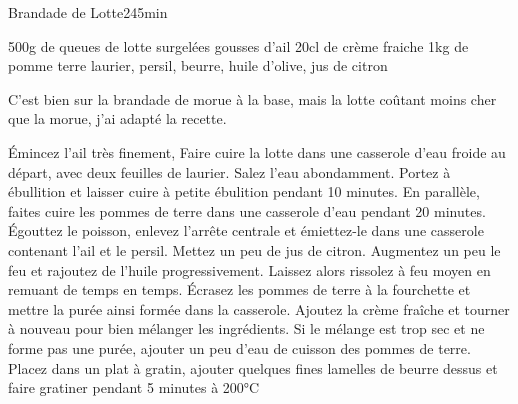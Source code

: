 \begin{recette}{Brandade de Lotte}{2}{45min}{}
\begin{ingredients}
\ingredient 500g de queues de lotte surgelées
 gousses d'ail
\ingredient 20cl de crème fraiche
\ingredient 1kg de pomme terre
\ingredient laurier, persil, beurre, huile d'olive, jus de citron
\end{ingredients}

\begin{remarque}
C'est bien sur la brandade de morue à la base, mais la lotte coûtant moins cher que la morue, j'ai adapté la recette.
\end{remarque}


\begin{preparation}
\etape Émincez l'ail très finement, 
\etape Faire cuire la lotte dans une casserole d'eau froide au départ, avec deux feuilles de laurier. Salez l'eau abondamment. Portez à ébullition et laisser cuire à petite ébulition pendant 10 minutes.
\etape En parallèle, faites cuire les pommes de terre dans une casserole d'eau pendant 20 minutes.
\etape Égouttez le poisson, enlevez l'arrête centrale et émiettez-le dans une casserole contenant l'ail et le persil. Mettez un peu de jus de citron. Augmentez un peu le feu et rajoutez de l'huile progressivement. Laissez alors rissolez à feu moyen en remuant de temps en temps.
\etape Écrasez les pommes de terre à la fourchette et mettre la purée ainsi formée dans la casserole.
\etape Ajoutez la crème fraîche et tourner à nouveau pour bien mélanger les ingrédients. Si le mélange est trop sec et ne forme pas une purée, ajouter un peu d'eau de cuisson des pommes de terre.
\etape Placez dans un plat à gratin, ajouter quelques fines lamelles de beurre dessus et faire gratiner pendant 5 minutes à 200°C
\end{preparation}

\end{recette}

